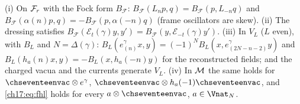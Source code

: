 \begin{theorem}\label{ch17:thm:genadjoint}
(i) On $\mathcal{F}_r$ with the Fock form $B_{\mathcal F}$: $B_{\mathcal F}(L_np,q)=B_{\mathcal F}(p,L_{-n}q)$ and $B_{\mathcal F}(\alpha(n)p,q)=-B_{\mathcal F}(p,\alpha(-n)q)$ (frame
oscillators are skew).  (ii) The dressing satisfies $B_{\mathcal F}(\mathcal E_t(\gamma)y,y')=B_{\mathcal F}(y,\mathcal E_{-t}(\gamma)y')$.  (iii) In $V_L$
($L$ even), with $B_L$ and $N=\Delta(\gamma)$: $B_L(e^\gamma_{(n)}x,y)=(-1)^NB_L(x,e^\gamma_{(2N-n-2)}y)$ and
$B_L(h_a(n)x,y)=-B_L(x,h_a(-n)y)$ for the reconstructed fields; and the charged vacua and the currents generate $V_L$.
(iv) In $\mathcal{M}$ the same holds for $\chseventeenvac\otimes e^\gamma$, $\chseventeenvac\otimes h_a(-1)\chseventeenvac$, and \eqref{ch17:eq:fhl} holds for every
$a\otimes\chseventeenvac$, $a\in\Vnat_N$.
\end{theorem}

